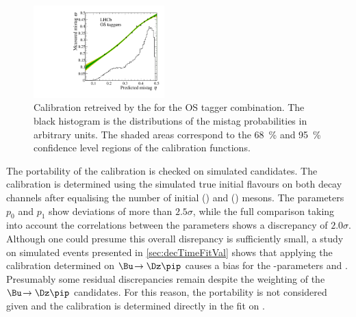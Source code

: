 \begin{figure}[tbp]
	\begin{center}
		\includegraphics[width=0.45\textwidth]{08FlavourTagging/figs/CalibrationOS.pdf}
	\end{center}
	\caption{Calibration retreived by the for the OS tagger combination.
	The black histogram is the distributions of the mistag probabilities in arbitrary units.
	The shaded areas correspond to the \SI{68}{\percent} and \SI{95}{\percent} confidence level regions of the calibration functions.}
	\label{fig:CalibOS}
\end{figure}

The portability of the calibration is checked on simulated candidates.
The calibration is determined using the simulated true initial flavours on both decay channels after equalising the number of initial \Bz (\Bu) and \Bzb (\Bm) mesons.
The parameters $p_0$ and $p_1$ show deviations of more than $2.5\sigma$, while the full comparison taking into account the correlations between the parameters shows a discrepancy of $2.0\sigma$.
Although one could presume this overall disrepancy is sufficiently small, a study on simulated events presented in \cref{sec:decTimeFitVal} shows that applying the calibration determined on $\Bu\!\to\Dz\pip$ causes a bias for the \CP-parameters \Sf and \Sfbar.
Presumably some residual discrepancies remain despite the weighting of the $\Bu\!\to\Dz\pip$ candidates.
For this reason, the portability is not considered given and the calibration is determined directly in the \CP fit on \BdToDpi.
